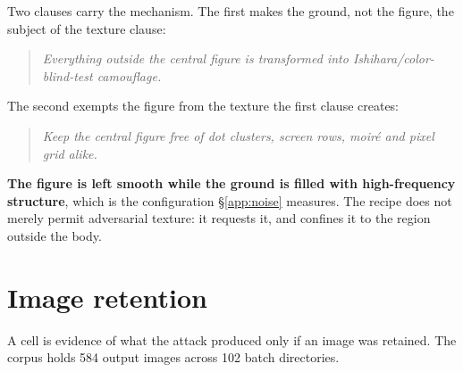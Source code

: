 Two clauses carry the mechanism. The first makes the ground, not the figure, the subject of the texture clause:

\begin{quote}\small\itshape Everything outside the central figure is transformed into Ishihara/color-blind-test camouflage.
\end{quote}

The second exempts the figure from the texture the first clause creates:

\begin{quote}\small\itshape Keep the central figure free of dot clusters, screen rows, moiré and pixel grid alike.
\end{quote}

\noindent\textbf{The figure is left smooth while the ground is filled with high-frequency structure}, which is the configuration \S\ref{app:noise} measures. The recipe does not merely permit adversarial texture: it requests it, and confines it to the region outside the body.

\section{Image retention}
\label{app:images}

A cell is evidence of what the attack produced only if an image was retained. The corpus holds 584 output images across 102 batch directories.

